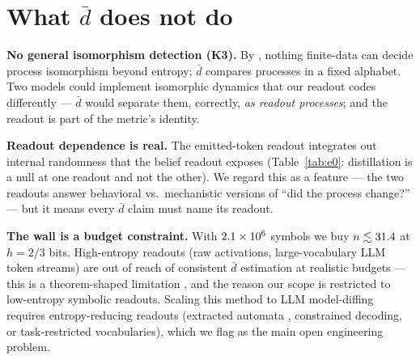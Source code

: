 \documentclass[11pt]{article}
\newcommand{\dbar}{\bar d}
\begin{document}
\section{What $\dbar$ does not do}\label{sec:limits}

\textbf{No general isomorphism detection (K3).} By \citet{ornstein2007entropy},
nothing finite-data can decide process isomorphism beyond entropy; $\dbar$ compares
processes in a fixed alphabet. Two models could implement isomorphic dynamics that
our readout codes differently --- $\dbar$ would separate them, correctly, \emph{as
readout processes}; and the readout is part of the metric's identity.

\textbf{Readout dependence is real.} The emitted-token readout integrates out
internal randomness that the belief readout exposes (Table~\ref{tab:e0}: distillation
is a null at one readout and not the other). We regard this as a feature --- the two
readouts answer behavioral vs.\ mechanistic versions of ``did the process change?'' ---
but it means every $\dbar$ claim must name its readout.

\textbf{The wall is a budget constraint.} With $2.1\times10^{6}$ symbols we buy
$n \lesssim 31.4$ at $h = 2/3$ bits. High-entropy readouts (raw activations,
large-vocabulary LLM token streams) are out of reach of consistent $\dbar$ estimation
at realistic budgets --- this is a theorem-shaped limitation
\citep{marton1994entropy}, and the reason our scope is restricted to low-entropy
symbolic readouts. Scaling this method to LLM model-diffing requires
entropy-reducing readouts (extracted automata \citep{weiss2018extracting,
adriaensen2024extracting}, constrained decoding, or task-restricted vocabularies),
which we flag as the main open engineering problem.
\end{document}
